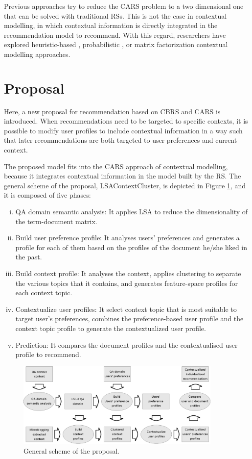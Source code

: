 \documentclass[preprint]{elsarticle}
\begin{document}
\begin{spacing}{1.5}
Previous approaches try to reduce the CARS problem to a two dimensional one that can be solved with traditional RSs. This is not the case in contextual modelling, in which contextual information is directly integrated in the recommendation model to recommend. With this regard, researchers have explored heuristic-based \cite{Panniello2014}, probabilistic \cite{Adomavicius2005b}, or matrix factorization \cite{Baltrunas2011c} contextual modelling approaches.

\section{Proposal}
\label{sec:proposal}

Here, a new proposal for recommendation based on CBRS and CARS is introduced. When recommendations need to be targeted to specific contexts, it is possible to modify user profiles to include contextual information in a way such that later recommendations are both targeted to user preferences and current context.

The proposed model fits into the CARS approach of contextual modelling, because it integrates contextual information in the model built by the RS. The general scheme of the proposal, LSAContextCluster, is depicted in Figure \ref{fig:proposal-scheme}, and it is composed of five phases:
\begin{enumerate}[(i)]
	\item QA domain semantic analysis: It applies LSA to reduce the dimensionality of the term-document matrix.
	\item Build user preference profile: It analyses users' preferences and generates a profile for each of them based on the profiles of the document he/she liked in the past.
	\item Build context profile: It analyses the context, applies clustering to separate the various topics that it contains, and generates feature-space profiles for each context topic.
	\item Contextualize user profiles: It select context topic that is most suitable to target user's preferences, combines the preference-based user profile and the context topic profile to generate the contextualized user profile.
	\item Prediction: It compares the document profiles and the contextualised user profile to recommend.
\end{enumerate}

\begin{figure}[h]
	\centering
	\includegraphics[width=0.9\textwidth]{figures/proposal-scheme.eps}
	\caption{General scheme of the proposal.}
	\label{fig:proposal-scheme}
\end{figure}


\end{spacing}
\end{document}
